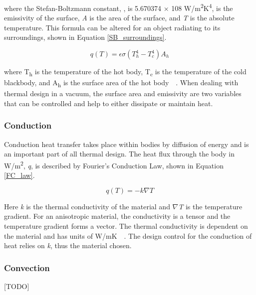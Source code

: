 where the Stefan-Boltzmann constant, \textsigma, is 5.670374 × 108 W/m\textsuperscript{2}K\textsuperscript{4}, {\textepsilon} is the emissivity of the surface, \textit{A} is the area of the surface, and \textit{T} is the absolute temperature. This formula can be altered for an object radiating to its surroundings, shown in Equation \ref{SB_surroundings}.

\begin{equation} \label{SB_surroundings}
    q(T) = \epsilon \sigma (T_h^4-T_c^4)A_h
\end{equation}

where T\textsubscript{h} is the temperature of the hot body, T\textsubscript{c} is the temperature of the cold blackbody, and A\textsubscript{h} is the surface area of the hot body~\cite{heat_transfer_textbook}~\cite{FEA_SW}. When dealing with thermal design in a vacuum, the surface area and emissivity are two variables that can be controlled and help to either dissipate or maintain heat.

\subsubsection{Conduction}
Conduction heat transfer takes place within bodies by diffusion of energy and is an important part of all thermal design. The heat flux through the body in W/m\textsuperscript{2}, \textit{q}, is described by Fourier’s Conduction Law, shown in Equation \ref{FC_law}.

\begin{equation} \label{FC_law}
    q(T) = -k\nabla T
\end{equation}

Here \textit{k} is the thermal conductivity of the material and $\nabla$\textit{T} is the temperature gradient. For an anisotropic material, the conductivity is a tensor and the temperature gradient forms a vector. The thermal conductivity is dependent on the material and has units of W/mK~\cite{heat_transfer_textbook}~\cite{FEA_SW}. The design control for the conduction of heat relies on \textit{k}, thus the material chosen.

\subsubsection{Convection}
[TODO]

